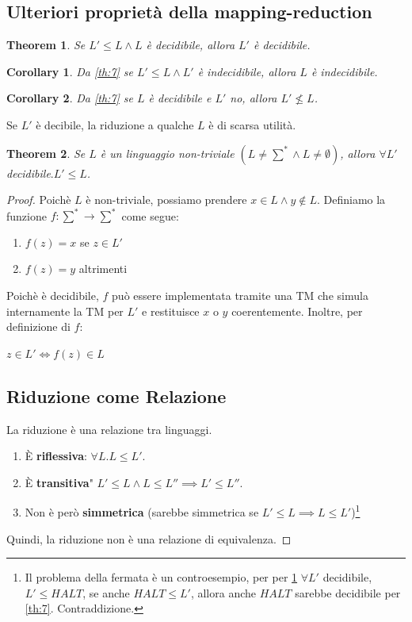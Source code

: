 \documentclass[a4paper, 12pt]{article}
\newtheorem{theorem}{Theorem}[section]
\newtheorem{corollary}{Corollary}[theorem]
\begin{document}
\subsection{Ulteriori propriet\`a della mapping-reduction}
\begin{theorem}
\label{th:8}
Se $L' \leq L \land L$ \`e decidibile, allora $L'$ \`e decidibile.
\end{theorem}
\begin{corollary}
Da \ref{th:7} se $L' \leq L \land L'$ \`e indecidibile, allora $L$ \`e indecidibile.
\end{corollary}
\begin{corollary}
Da \ref{th:7} se $L$ \`e decidibile e $L'$ no, allora $L' \nleq L$.
\end{corollary}
Se $L'$ \`e decibile, la riduzione a qualche $L$ \`e di scarsa utilit\`a.
\begin{theorem}
\label{th:9}
Se $L$ \`e un linguaggio non-triviale $(L \neq \sum^{*} \land L \neq \emptyset)$, allora $\forall L'$ decidibile$.L' \leq L$.
\end{theorem}
\begin{proof}
Poich\`e $L$ \`e non-triviale, possiamo prendere $x \in L \land y \notin L$. Definiamo la funzione $f: \sum^{*} \rightarrow \sum^{*}$ come segue:
\begin{enumerate}
\item $f(z) = x$ se $z \in L'$
\item $f(z) = y$ altrimenti 
\end{enumerate}
Poich\`e \`e decidibile, $f$ pu\`o essere implementata tramite una TM che simula internamente la TM per $L'$ e restituisce $x$ o $y$ coerentemente. Inoltre, per definizione di $f$: \begin{center}
$z \in L' \iff f(z) \in L$
\end{center}
\subsection{Riduzione come Relazione}
La riduzione \`e una relazione tra linguaggi.\begin{enumerate}
\item \`E \textbf{riflessiva}: $\forall L. L \leq L'$.
\item \`E \textbf{transitiva}" $L' \leq L \land L \leq L''  \implies L' \leq L''$.
\item Non \`e per\`o \textbf{simmetrica} (sarebbe simmetrica se $L' \leq L \implies L \leq L'$)\footnote{Il problema della fermata \`e un controesempio, per per \ref{th:8} $\forall L'$ decidibile, $L' \leq HALT$, se anche $HALT \leq L'$, allora anche $HALT$ sarebbe decidibile per \ref{th:7}. Contraddizione.} 
\end{enumerate}
Quindi, la riduzione non \`e una relazione di equivalenza. 
\end{proof}
\end{document}
